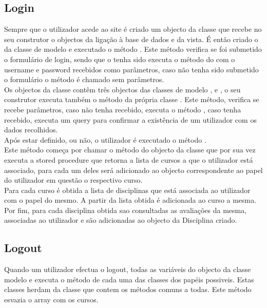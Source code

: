 \subsection{Login}
Sempre que o utilizador acede ao site é criado um objecto da classe  que recebe no seu construtor o objectos da ligação à base de dados e da vista. É então criado o  da classe de modelo  e executado o método . Este método verifica se foi submetido o formulário de login, sendo que o tenha sido executa o método  do  com o username e password recebidos como parâmetros, caso não tenha sido submetido o formulário o método é chamado sem parâmetros.\\
Os objectos da classe  contêm três objectos das classes de modelo ,  e , o seu construtor executa também o método da própria classe . Este método, verifica se recebe parâmetros, caso não tenha recebido, executa o método , caso tenha recebido, executa um query para confirmar a existência de um utilizador com os dados recolhidos.\\
Após estar definido, ou não, o utilizador é executado o método .\\
Este método começa por chamar o método  do objecto da classe  que por sua vez executa a stored procedure  que retorna a lista de cursos a que o utilizador está associado, para cada um deles será adicionado ao objecto correspondente ao papel do utilizador em questão o respectivo curso.\\
Para cada curso é obtida a lista de disciplinas que está associada ao utilizador com o papel do mesmo. A partir da lista obtida é adicionada ao curso a mesma.\\
Por fim, para cada disciplina obtida sao consultadas as avaliações da mesma, associadas ao utilizador e são adicionadas ao objecto da Disciplina criado.\\

\subsection{Logout}
Quando um utilizador efectua o logout, todas as variáveis do objecto da classe modelo  e executa o método  de cada uma das classes dos papéis possiveis. Estas classes herdam da classe  que contem os métodos comuns a todas. Este método esvazia o array com os cursos.

